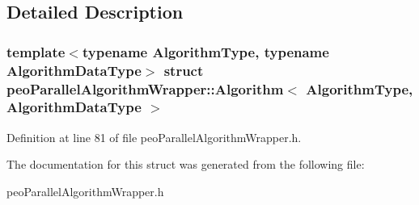 \subsection{Detailed Description}
\subsubsection*{template$<$typename Algorithm\-Type, typename Algorithm\-Data\-Type$>$ struct peo\-Parallel\-Algorithm\-Wrapper::Algorithm$<$ Algorithm\-Type, Algorithm\-Data\-Type $>$}





Definition at line 81 of file peo\-Parallel\-Algorithm\-Wrapper.h.

The documentation for this struct was generated from the following file:\begin{CompactItemize}
\item 
peo\-Parallel\-Algorithm\-Wrapper.h\end{CompactItemize}
